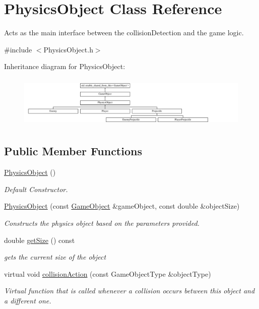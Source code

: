 \hypertarget{class_physics_object}{}\section{Physics\+Object Class Reference}
\label{class_physics_object}


Acts as the main interface between the collision\+Detection and the game logic.  




{\ttfamily \#include $<$Physics\+Object.\+h$>$}

Inheritance diagram for Physics\+Object\+:\begin{figure}[H]
\begin{center}
\leavevmode
\includegraphics[height=2.527076cm]{d6/db5/class_physics_object}
\end{center}
\end{figure}
\subsection*{Public Member Functions}
\begin{DoxyCompactItemize}
\item 
\mbox{\label{class_physics_object_a0dd37cc0f9535b676d3df937eaeb4780}} 
\hyperlink{class_physics_object_a0dd37cc0f9535b676d3df937eaeb4780}{Physics\+Object} ()
\begin{DoxyCompactList}\small\item\em Default Constructor. \end{DoxyCompactList}\item 
\hyperlink{class_physics_object_a8a92618716bd764c63f0ca80436a950c}{Physics\+Object} (const \hyperlink{class_game_object}{Game\+Object} \&game\+Object, const double \&object\+Size)
\begin{DoxyCompactList}\small\item\em Constructs the physics object based on the parameters provided. \end{DoxyCompactList}\item 
double \hyperlink{class_physics_object_adc592e9846ebedea3d58d50c5ada1c12}{get\+Size} () const
\begin{DoxyCompactList}\small\item\em gets the current size of the object \end{DoxyCompactList}\item 
virtual void \hyperlink{class_physics_object_a16163f4e5bf781b3814d024c9f44a276}{collision\+Action} (const Game\+Object\+Type \&object\+Type)
\begin{DoxyCompactList}\small\item\em Virtual function that is called whenever a collision occurs between this object and a different one. \end{DoxyCompactList}\end{DoxyCompactItemize}

